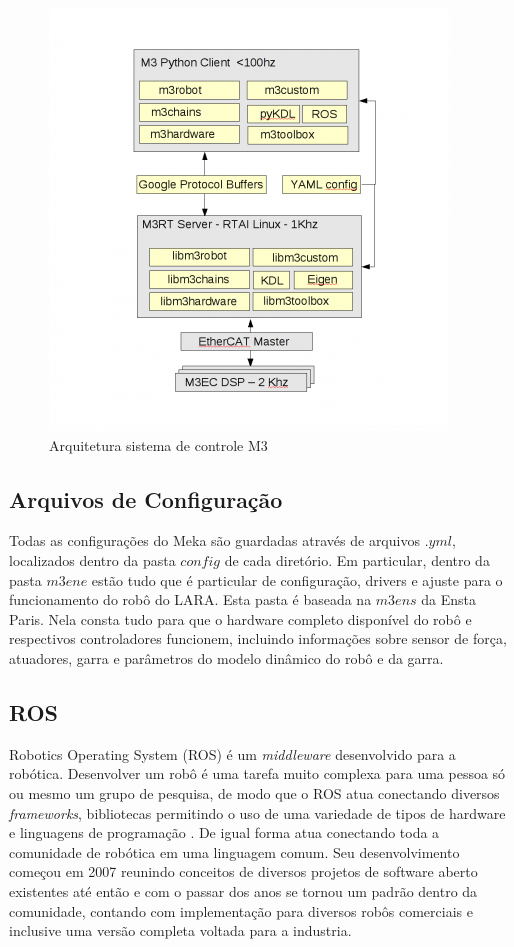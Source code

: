 
\begin{figure}[H]
    \centering
    \includegraphics[width=0.7\linewidth]{tex/figs/m3arch.png}
    \caption{Arquitetura sistema de controle M3 \cite{mekaguide}}
    \label{fig:m3arch}
\end{figure}

\subsection{Arquivos de Configuração}

Todas as configurações do Meka são guardadas através de arquivos $.yml$, localizados dentro da pasta $config$ de cada diretório. Em particular, dentro da pasta $m3ene$ estão tudo que é particular de configuração, drivers e ajuste para o funcionamento do robô do LARA. Esta pasta é baseada na $m3ens$ da Ensta Paris. Nela consta tudo para que o hardware completo disponível do robô e respectivos controladores funcionem, incluindo informações sobre sensor de força, atuadores, garra e parâmetros do modelo dinâmico do robô e da garra.

\subsection{ROS}

Robotics Operating System (ROS) é um \textit{middleware} desenvolvido para a robótica. Desenvolver um robô é uma tarefa muito complexa para uma pessoa só ou mesmo um grupo de pesquisa, de modo que o ROS atua conectando diversos \textit{frameworks}, bibliotecas permitindo o uso de uma variedade de tipos de hardware e linguagens de programação \cite{quigley2009ros}. De igual forma atua conectando toda a comunidade de robótica em uma linguagem comum. Seu desenvolvimento começou em 2007 reunindo conceitos de diversos projetos de software aberto existentes até então e com o passar dos anos se tornou um padrão dentro da comunidade, contando com implementação para diversos robôs comerciais e inclusive uma versão completa voltada para a industria.

